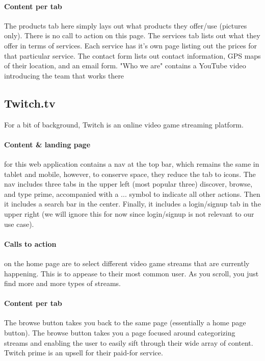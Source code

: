 \paragraph{Content per tab}
The products tab here simply lays out what products they offer/use (pictures only). There is no call to action on this page. The services tab lists out what they offer in terms of services. Each service has it's own page listing out the prices for that particular service. The contact form lists out contact information, GPS maps of their location, and an email form. "Who we are" contains a YouTube video introducing the team that works there

\subsection{Twitch.tv}
For a bit of background, Twitch is an online video game streaming platform.

\paragraph{Content & landing page}
for this web application contains a nav at the top bar, which remains the same in tablet and mobile, however, to conserve space, they reduce the tab to icons. The nav includes three tabs in the upper left (most popular three) discover, browse, and type prime, accompanied with a ... symbol to indicate all other actions. Then it includes a search bar in the center. Finally, it includes a login/signup tab in the upper right (we will ignore this for now since login/signup is not relevant to our use case).

\paragraph{Calls to action}
on the home page are to select different video game streams that are currently happening. This is to appease to their most common user. As you scroll, you just find more and more types of streams.

\paragraph{Content per tab}
The browse button takes you back to the same page (essentially a home page button). The browse button takes you a page focused around categorizing streams and enabling the user to easily sift through their wide array of content. Twitch prime is an upsell for their paid-for service.

